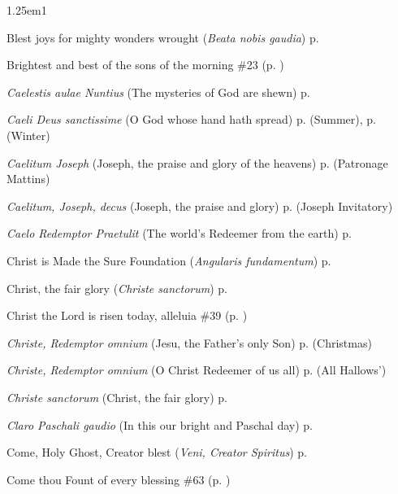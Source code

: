 \begin{hangparas}{1.25em}{1}
\par\noindent
Blest joys for mighty wonders wrought (\textit{Beata nobis gaudia}) \dotfill p. \pageref{WhitsundayMattinsHymn}
\par\noindent
Brightest and best of the sons of the morning \dotfill \#23 (p. \pageref{Hymn23})
\par\noindent
\textit{Caelestis aulae Nuntius} (The mysteries of God are shewn) \dotfill p. \pageref{HolyRosaryIEvensong}
\par\noindent
\textit{Caeli Deus sanctissime} (O God whose hand hath spread) \dotfill p. \pageref{WednesdayEvensongSummer} (Summer), p. \pageref{WednesdayEvensongWinter} (Winter)
\par\noindent
\textit{Caelitum Joseph} (Joseph, the praise and glory of the heavens) \dotfill p. \pageref{PatronageMattins} (Patronage Mattins)
\par\noindent
\textit{Caelitum, Joseph, decus} (Joseph, the praise and glory) \dotfill p. \pageref{JosephInvitatory} (Joseph Invitatory)
\par\noindent
\textit{Caelo Redemptor Praetulit} (The world's Redeemer from the earth) \dotfill p. \pageref{MotherhoodInvitatory}
\par\noindent
Christ is Made the Sure Foundation (\textit{Angularis fundamentum}) \dotfill p. \pageref{DedicationMattins}
\par\noindent
Christ, the fair glory (\textit{Christe sanctorum}) \dotfill p. \pageref{MichaelMattins}
\par\noindent
Christ the Lord is risen today, alleluia \dotfill \#39 (p. \pageref{Hymn39})
\par\noindent
\textit{Christe, Redemptor omnium} (Jesu, the Father's only Son) \dotfill p. \pageref{ChristmasEvensongHymn} (Christmas)
\par\noindent
\textit{Christe, Redemptor omnium} (O Christ Redeemer of us all) \dotfill p. \pageref{AllHallowsEvensong} (All Hallows')
\par\noindent
\textit{Christe sanctorum} (Christ, the fair glory) \dotfill p. \pageref{MichaelMattins}
\par\noindent
\textit{Claro Paschali gaudio} (In this our bright and Paschal day) \dotfill p. \pageref{ApostlesMattinsEaster}
\par\noindent
Come, Holy Ghost, Creator blest (\textit{Veni, Creator Spiritus}) \dotfill p. \pageref{WhitsundayEvensongHymn}
\par\noindent
Come thou Fount of every blessing \dotfill \#63 (p. \pageref{Hymn63})
\par\noindent

\end{hangparas}
